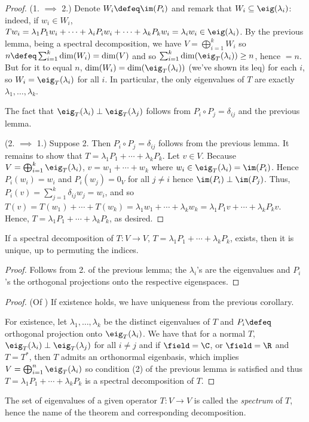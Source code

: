 \begin{proof}
    (1. $\implies$ 2.) Denote $W_i \defeq \im(P_i)$ and remark that $W_i \subseteq \eig(\lambda_i)$: indeed, if $w_i \in W_i$, $Tw_i= \lambda_1 P_1w_i+\cdots+\lambda_i P_iw_i+\cdots+\lambda_kP_kw_i = \lambda_i w_i \in \eig(\lambda_i)$. By the previous lemma, being a spectral decomposition, we have $V = \bigoplus_{i=1}^k W_i$ so $n \defeq \sum_{i=1}^k \dim(W_i) = \dim(V)$ and so $\sum_{i=1}^k \dim(\eig_T(\lambda_i)) \geq n$, hence $=n$. But for it to equal $n$, $\dim(W_i) = \dim(\eig_T(\lambda_i))$ (we've shown its leq) for each $i$, so $W_i = \eig_T(\lambda_i)$ for all $i$. In particular, the only eigenvalues of $T$ are exactly $\lambda_1, \dots, \lambda_k$.

    The fact that $\eig_T(\lambda_i) \perp \eig_T(\lambda_j)$ follows from $P_i \circ P_j = \delta_{ij}$ and the previous lemma.

    (2. $\implies$ 1.) Suppose 2. Then $P_i \circ P_j = \delta_{ij}$ follows from the previous lemma. It remains to show that $T = \lambda_1 P_1 + \cdots + \lambda_k P_k$. Let $v \in V$. Because $V = \bigoplus_{i=1}^k \eig_T(\lambda_i)$, $v = w_1 + \cdots + w_k$ where $w_i \in \eig_T(\lambda_i) = \im(P_i)$. Hence $P_i(w_i) = w_i$ and $P_i(w_j) = 0_V$ for all $j \neq i$ hence $\im(P_i) \perp \im(P_j)$. Thus, $P_i(v) = \sum_{j=1}^k \delta_{ij} w_j = w_i$, and so $T(v) = T(w_1) + \cdots + T(w_k) = \lambda_1 w_1 + \cdots + \lambda_k w_k = \lambda_1P_1v + \cdots + \lambda_k P_k v$. Hence, $T = \lambda_1 P_1 + \cdots + \lambda_k P_k$, as desired.
\end{proof}

\begin{corollary}
    If a spectral decomposition of $T : V \to V$, $T = \lambda_1 P_1 + \cdots + \lambda_k P_k$, exists, then it is unique, up to permuting the indices.
\end{corollary}

\begin{proof}
    Follows from 2. of the previous lemma; the $\lambda_i$'s are the eigenvalues and $P_i$'s the orthogonal projections onto the respective eigenspaces.
\end{proof}

\begin{proof}(Of )
    If existence holds, we have uniqueness from the previous corollary.

    For existence, let $\lambda_1, \dots, \lambda_k$ be the distinct eigenvalues of $T$ and $P_i \defeq$ orthogonal projection onto $\eig_T(\lambda_i)$. We have that for a normal $T$, $\eig_T(\lambda_i) \perp \eig_T(\lambda_j)$ for all $i \neq j$ and if $\field = \C$, or $\field = \R$ and $T = T^\ast$, then $T$ admits an orthonormal eigenbasis, which implies $V = \bigoplus_{i=1}^n \eig_T(\lambda_i)$ so condition (2) of the previous lemma is satisfied and thus $T = \lambda_1 P_1 + \cdots + \lambda_k P_k$ is a spectral decomposition of $T$.
\end{proof}

\begin{remark}
    The set of eigenvalues of a given operator $T : V \to V$ is called the \emph{spectrum} of $T$, hence the name of the theorem and corresponding decomposition.
\end{remark}

